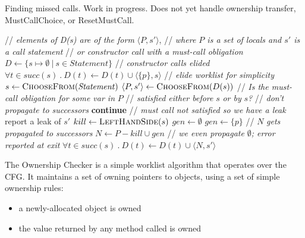 

\begin{algorithm}[t]
  \caption{Finding missed calls.  Work in progress.  Does not yet handle ownership transfer, MustCallChoice, or ResetMustCall.}
  \label{alg:find-copies}
  \begin{algorithmic}[1]
  \State // \textit{elements of D(s) are of the form} $\langle P, s' \rangle$,
  \State // \textit{where $P$ is a set of locals and $s'$ is a call statement}
  \State // \textit{or constructor call with a must-call obligation}
  \State $D \gets \{ s \mapsto \emptyset\ |\ s \in \mathit{Statement} \}$
    \State // \textit{constructor calls elided}
    \State $\forall t \in \mathit{succ}(s)\ .\ D(t) \leftarrow D(t) \cup \langle \{p\}, s \rangle$
    \EndIf
  \EndFor
  \State // \textit{elide worklist for simplicity}
    \State $s \gets \textsc{ChooseFrom}(\mathit{Statement})$
    \State $\langle P, s' \rangle \gets \textsc{ChooseFrom}(D(s))$
    \State // \textit{Is the must-call obligation for some var in } $P$
    \State // \textit{satisfied either before }$s$\textit{ or by } $s$\textit{?}
    \State // \textit{don't propagate to successors}
    \State \textbf{continue} 
    \EndIf
    \State // \textit{must call not satisfied so we have a leak}
    \State report a leak of $s'$
    \EndIf
    \State $kill \gets \textsc{LeftHandSide}(s)$
    \State $gen \gets \emptyset$
    \State $gen \gets \{p\}$
    \EndIf
    \State // $N$ \textit{gets propagated to successors}
    \State $N \gets P - kill \cup gen$
    \State // \textit{we even propagate }$\emptyset$\textit{; error reported at exit}
    \State $\forall t \in \mathit{succ}(s)\ .\ D(t) \leftarrow D(t) \cup \langle N, s' \rangle$
  \EndWhile \label{li:alg-loop-end}
  \EndProcedure
  \end{algorithmic}
\end{algorithm}


The Ownership Checker is a simple worklist algorithm that operates over the CFG.
It maintains a set of owning pointers to objects, using a set of simple
ownership rules:
\begin{itemize}
\item a newly-allocated object is owned
\item the value returned by any method called is owned
\end{itemize}

